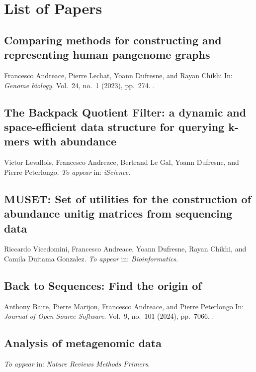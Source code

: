 \chapter{List of Papers}


\section*{Comparing methods for constructing and representing human pangenome graphs}
Francesco Andreace, Pierre Lechat, Yoann Dufresne, and Rayan Chikhi
In: \emph{Genome biology}.
Vol.\ 24,
no.\ 1
(2023),
pp.~274.
.

\section*{The Backpack Quotient Filter: a dynamic and space-efficient data structure for querying k-mers with abundance}
Victor Levallois, Francesco Andreace, Bertrand Le Gal, Yoann Dufresne, and Pierre Peterlongo.
\emph{To appear} in: \emph{iScience}.



\section*{MUSET: Set of utilities for the construction of abundance unitig matrices from sequencing data}
Riccardo Vicedomini, Francesco Andreace, Yoann Dufresne, Rayan Chikhi, and Camila Duitama Gonzalez.
\emph{To appear} in: \emph{Bioinformatics}.


\section*{Back to Sequences: Find the origin of \kmers}
Anthony Baire, Pierre Marijon, Francesco Andreace, and Pierre
Peterlongo 
In: \emph{Journal of Open Source Software}.
Vol.\ 9,
no.\ 101
(2024),
pp.~7066.
.


\section*{Analysis of metagenomic data}
\emph{To appear} in: \emph{Nature Reviews Methods Primers}.



